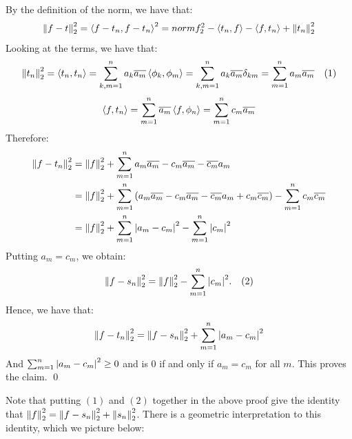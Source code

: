\begin{nproof}
    By the definition of the norm, we have that:
    \begin{align*}
        \norm{f - t}_2^2 = \left< f - t_n, f - t_n \right>^2 = norm{f}_2^2 - \left< t_n, f \right> - \left< f, t_n \right> + \norm{t_n}_2^2
    \end{align*}
    Looking at the terms, we have that:
    \begin{align*}
        \norm{t_n}_2^2 = \left< t_n, t_n \right> = \sum_{k, m = 1}^n a_k\overline{a_m}\left< \phi_k, \phi_m \right> = \sum_{k, m = 1}^n a_k\overline{a_m}\delta_{km} = \sum_{m=1}^n a_m\overline{a_m} \quad (1)
    \end{align*}
    \begin{align*}
        \left< f, t_n \right> = \sum_{m=1}^n \overline{a_m}\left< f, \phi_n \right> = \sum_{m=1}^n c_m\overline{a_m}
    \end{align*}
    Therefore:
    \begin{align*}
        \norm{f - t_n}_2^2 &= \norm{f}_2^2 + \sum_{m=1}^n a_m\overline{a_m} - c_m\overline{a_m} - \overline{c_m}a_m 
        \\ &= \norm{f}_2^2 + \sum_{m=1}^n \left(a_m\overline{a_m} - c_m\overline{a_m} - \overline{c_m}a_m + c_m\overline{c_m}\right) - \sum_{m=1}^n c_m\overline{c_m}
        \\ &= \norm{f}_2^2 + \sum_{m=1}^n \abs{a_m - c_m}^2 - \sum_{m=1}^n \abs{c_m}^2
    \end{align*}
    Putting $a_m = c_m$, we obtain:
    \begin{align*}
        \norm{f - s_n}_2^2 = \norm{f}_2^2 - \sum_{m=1}^n \abs{c_m}^2. \quad (2)
    \end{align*} Hence, we have that:
    \begin{align*}
        \norm{f - t_n}_2^2 = \norm{f - s_n}_2^2 + \sum_{m=1}^n \abs{a_m - c_m}^2
    \end{align*} 
    And $\sum_{m=1}^n \abs{a_m - c_m}^2 \geq 0$ and is $0$ if and only if $a_m = c_m$ for all $m$. This proves the claim. \qed
\end{nproof}
\noindent Note that putting $(1)$ and $(2)$ together in the above proof give the identity that $\norm{f}_2^2 = \norm{f - s_n}_2^2 + \norm{s_n}_2^2$. There is a geometric interpretation to this identity, which we picture below:

